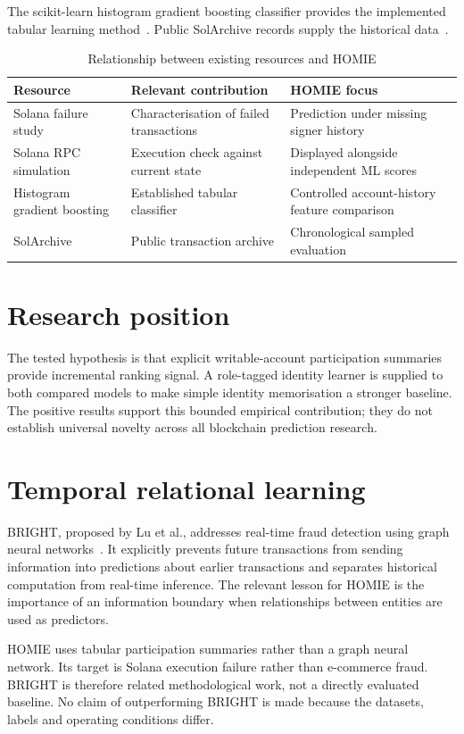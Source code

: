 \documentclass[12pt,a4paper,oneside]{report}
\begin{document}
The scikit-learn histogram gradient boosting classifier provides the implemented tabular learning method~\cite{hgb}. Public SolArchive records supply the historical data~\cite{archive}.
\begin{table}[ht]\centering\caption{Relationship between existing resources and HOMIE}
\small\begin{tabularx}{\textwidth}{p{32mm}YY}\toprule
Resource&Relevant contribution&HOMIE focus\\\midrule
Solana failure study&Characterisation of failed transactions&Prediction under missing signer history\\
Solana RPC simulation&Execution check against current state&Displayed alongside independent ML scores\\
Histogram gradient boosting&Established tabular classifier&Controlled account-history feature comparison\\
SolArchive&Public transaction archive&Chronological sampled evaluation\\\bottomrule\end{tabularx}\end{table}
\section{Research position}
The tested hypothesis is that explicit writable-account participation summaries provide incremental ranking signal. A role-tagged identity learner is supplied to both compared models to make simple identity memorisation a stronger baseline. The positive results support this bounded empirical contribution; they do not establish universal novelty across all blockchain prediction research.

\section{Temporal relational learning}
BRIGHT, proposed by Lu et al., addresses real-time fraud detection using graph neural networks~\cite{bright}. It explicitly prevents future transactions from sending information into predictions about earlier transactions and separates historical computation from real-time inference. The relevant lesson for HOMIE is the importance of an information boundary when relationships between entities are used as predictors.

HOMIE uses tabular participation summaries rather than a graph neural network. Its target is Solana execution failure rather than e-commerce fraud. BRIGHT is therefore related methodological work, not a directly evaluated baseline. No claim of outperforming BRIGHT is made because the datasets, labels and operating conditions differ.
\end{document}
